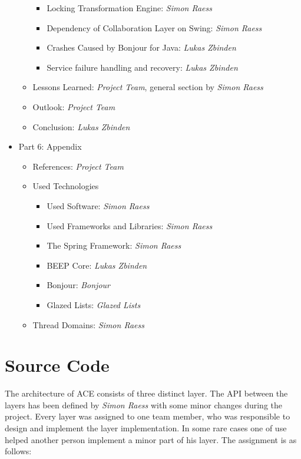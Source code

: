 \begin{itemize}
\begin{itemize}
\begin{itemize}
   \item Locking Transformation Engine: \emph{Simon Raess}
   \item Dependency of Collaboration Layer on Swing: \emph{Simon Raess}
   \item Crashes Caused by Bonjour for Java: \emph{Lukas Zbinden}
   \item Service failure handling and recovery: \emph{Lukas Zbinden}
  \end{itemize}
  \item Lessons Learned: \emph{Project Team}, general section by \emph{Simon Raess}
  \item Outlook: \emph{Project Team}
  \item Conclusion: \emph{Lukas Zbinden}
 \end{itemize}
 \item Part 6: Appendix
 \begin{itemize}
  \item References: \emph{Project Team}
  \item Used Technologies
  \begin{itemize}
   \item Used Software: \emph{Simon Raess}
   \item Used Frameworks and Libraries: \emph{Simon Raess}
   \item The Spring Framework: \emph{Simon Raess}
   \item BEEP Core: \emph{Lukas Zbinden}
   \item Bonjour: \emph{Bonjour}
   \item Glazed Lists: \emph{Glazed Lists}
  \end{itemize}
  \item Thread Domains: \emph{Simon Raess}
 \end{itemize}
\end{itemize}



\section{Source Code}
The architecture of ACE consists of three distinct layer. The 
API between the layers has been defined by \emph{Simon Raess} with some 
minor changes during the project. Every layer
was assigned to one team member, who was responsible to design and implement
the layer implementation. In some rare cases one of use helped another
person implement a minor part of his layer. The assignment is as follows:

